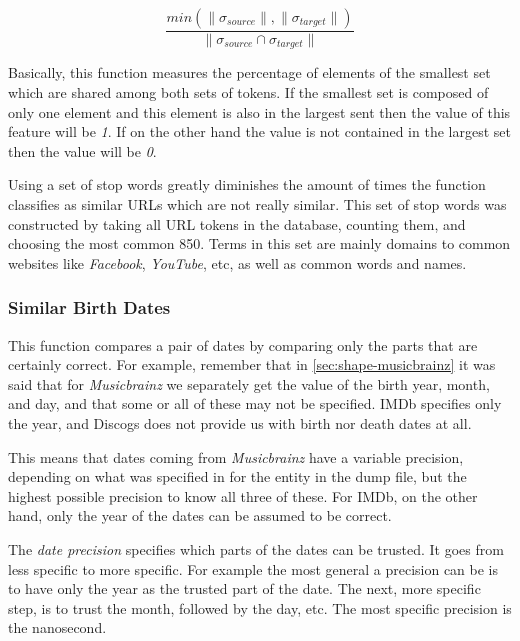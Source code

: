 \documentclass[epsfig,a4paper,11pt,titlepage,twoside,openany]{book}
\begin{document}
\begin{equation*}
    \frac{
        min(\|\sigma_{source}\|, \|\sigma_{target}\|)}
        {\|\sigma_{source} \cap \sigma_{target}\|}
\end{equation*}

Basically, this function measures the percentage of elements of the smallest set which are shared among both sets of tokens. If the smallest set is composed of only one element and this element is also in the largest sent then the value of this feature will be \textit{1}. If on the other hand the value is not contained in the largest set then the value will be \textit{0}.

Using a set of stop words greatly diminishes the amount of times the function classifies as similar URLs which are not really similar. This set of stop words was constructed by taking all URL tokens in the database, counting them, and choosing the most common 850. Terms in this set are mainly domains to common websites like \textit{Facebook}, \textit{YouTube}, etc, as well as common words and names.


\subsubsection{Similar Birth Dates}
\label{sec:feature-similar-birth-dates}
 
 This function compares a pair of dates by comparing only the parts that are certainly correct. For example, remember that in \autoref{sec:shape-musicbrainz} it was said that for \textit{Musicbrainz} we separately get the value of the birth year, month, and day, and that some or all of these may not be specified. IMDb specifies only the year, and Discogs does not provide us with birth nor death dates at all. 
 
 This means that dates coming from \textit{Musicbrainz} have a variable precision, depending on what was specified in for the entity in the dump file, but the highest possible precision to know all three of these. For IMDb, on the other hand, only the year of the dates can be assumed to be correct.
 
 The \textit{date precision} specifies which parts of the dates can be trusted. It goes from less specific to more specific. For example the most general a precision can be is to have only the year as the trusted part of the date. The next, more specific step, is to trust the month, followed by the day, etc. The most specific precision is the nanosecond. 
 
\end{document}
